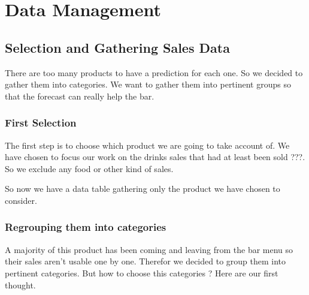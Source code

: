 \documentclass{report}
\begin{document}
\chapter{Data Management}

\section{Selection and Gathering Sales Data}

There are too many products to have a prediction for each one. So we decided to gather them into categories. We want to gather them into pertinent groups so that the forecast can really help the bar. 

\subsection{First Selection}

The first step is to choose which product we are going to take account of. We have chosen to focus our work on the drinks sales that had at least been sold ???. So we exclude any food or other kind of sales. 

So now we have a data table gathering only the product we have chosen to consider.

\subsection{Regrouping them into categories}

A majority of this product has been coming and leaving from the bar menu so their sales aren't usable one by one. Therefor we decided to group them into pertinent categories. But how to choose this categories ? Here are our first thought.

\pagebreak
\end{document}
